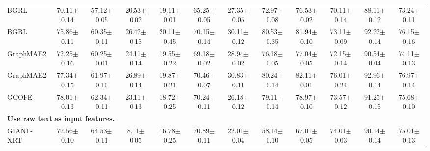 \begin{table*}[t]
\begin{tabular}{lccccccccccc}
    BGRL & 70.11{\footnotesize$\pm$0.14} & 57.12{\footnotesize$\pm$0.05} & 20.53{\footnotesize$\pm$0.02} & 19.11{\footnotesize$\pm$0.01} & 65.25{\footnotesize$\pm$0.05} & 27.35{\footnotesize$\pm$0.05} & 72.97{\footnotesize$\pm$0.08} & 76.53{\footnotesize$\pm$0.02} & 70.11{\footnotesize$\pm$0.14} & 88.11{\footnotesize$\pm$0.12} & 73.24{\footnotesize$\pm$0.11}\\
    \rowcolor{Gray} BGRL & 75.86{\footnotesize$\pm$0.11} & 60.35{\footnotesize$\pm$0.11} & 26.42{\footnotesize$\pm$0.15}& 20.11{\footnotesize$\pm$0.45} & 70.15{\footnotesize$\pm$0.14} & 30.11{\footnotesize$\pm$0.12} & 80.53{\footnotesize$\pm$0.35} & 81.94{\footnotesize$\pm$0.10} & 73.11{\footnotesize$\pm$0.09} & 92.22{\footnotesize$\pm$0.14} & 76.15{\footnotesize$\pm$0.16} \\
    GraphMAE2 & 72.25{\footnotesize$\pm$0.16} & 60.25{\footnotesize$\pm$0.01} & 24.11{\footnotesize$\pm$0.14} & 19.55{\footnotesize$\pm$0.22} & 69.18{\footnotesize$\pm$0.02} & 28.94{\footnotesize$\pm$0.02} & 76.18{\footnotesize$\pm$0.05} & 77.04{\footnotesize$\pm$0.05} & 72.15{\footnotesize$\pm$0.14} & 90.54{\footnotesize$\pm$0.04} & 74.11{\footnotesize$\pm$0.13}\\
    \rowcolor{Gray} GraphMAE2 & 77.34{\footnotesize$\pm$0.15} & 61.97{\footnotesize$\pm$0.10} & 26.89{\footnotesize$\pm$0.14}& 19.87{\footnotesize$\pm$0.21} & 70.46{\footnotesize$\pm$0.07} & 30.83{\footnotesize$\pm$0.11} & 80.24{\footnotesize$\pm$0.14} & 82.11{\footnotesize$\pm$0.01} & 76.01{\footnotesize$\pm$0.24} & 92.96{\footnotesize$\pm$0.14} & 76.97{\footnotesize$\pm$0.14} \\
    GCOPE & 78.01{\footnotesize$\pm$0.13} & 62.34{\footnotesize$\pm$0.11} & 23.11{\footnotesize$\pm$0.13}& 18.72{\footnotesize$\pm$0.25} & 70.24{\footnotesize$\pm$0.11} & 26.18{\footnotesize$\pm$0.12} & 79.11{\footnotesize$\pm$0.14} & 78.97{\footnotesize$\pm$0.10} & 73.57{\footnotesize$\pm$0.12} & 91.25{\footnotesize$\pm$0.15} & 75.68{\footnotesize$\pm$0.10} \\
    \midrule
    \multicolumn{5}{l}{\textbf{Use raw text as input features.}} \\
    GIANT-XRT  &  72.56{\footnotesize$\pm$0.10} & 64.53{\footnotesize$\pm$0.11} & 8.11{\footnotesize$\pm$0.05} & 16.78{\footnotesize$\pm$0.25} & 70.89{\footnotesize$\pm$0.11} & 22.01{\footnotesize$\pm$0.04} & 58.14{\footnotesize$\pm$0.10} & 67.01{\footnotesize$\pm$0.05} & 74.01{\footnotesize$\pm$0.03} & 90.14{\footnotesize$\pm$0.14} & 75.01{\footnotesize$\pm$0.13}\\

\end{tabular}
\end{table*}
